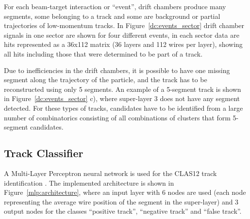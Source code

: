 \documentclass{webofc}
\begin{document}
For each beam-target interaction or ``event'', drift chambers produce many segments, some belonging 
to a track and some are background or partial trajectories of low-momentum tracks. In Figure~\ref{dc:events_sector} 
drift chamber signals in one sector are shown for four different  events, in each sector data are hits 
represented as a 36x112 matrix (36 layers and 112 wires per layer), showing all hits including those that 
were determined to be part of a track. 

Due to inefficiencies in the drift chambers, it is possible to have one missing segment along the trajectory 
of the particle, and the track has to be reconstructed using only 5 segments. An example of a 5-segment 
track is shown in Figure~\ref{dc:events_sector} c), where super-layer 3 does not have any segment detected. 
For these types of tracks, candidates have to be identified from a large number of combinatorics consisting 
of all combinations of clusters that form 5-segment candidates. 



 \subsection{Track Classifier}
 \label{track-classifier}
 
 
 A Multi-Layer Perceptron neural network is used for the CLAS12 track identification  \cite{Gavalian:2020oxg}. 
 The implemented architecture is shown in Figure~\ref{mlp:architecture}, where an input layer with 6 
 nodes are used (each node representing the average wire position of the segment in the super-layer) and 3 
 output nodes for the classes ``positive track'', ``negative track'' and ``false track''.
 
\end{document}
